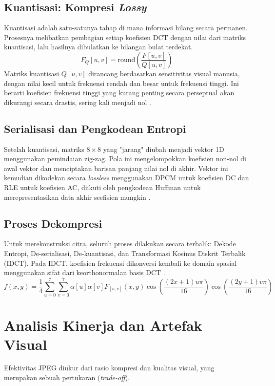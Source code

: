 \documentclass[a4paper]{article}
\begin{document}
\subsection{Kuantisasi: Kompresi \textit{Lossy}}
Kuantisasi adalah satu-satunya tahap di mana informasi hilang secara permanen. Prosesnya melibatkan pembagian setiap koefisien DCT dengan nilai dari matriks kuantisasi, lalu hasilnya dibulatkan ke bilangan bulat terdekat.
\begin{equation} \label{eq:quantization}
  F_Q[u, v] = \text{round}\left(\frac{F[u, v]}{Q[u, v]}\right)
\end{equation}
Matriks kuantisasi $Q[u,v]$ dirancang berdasarkan sensitivitas visual manusia, dengan nilai kecil untuk frekuensi rendah dan besar untuk frekuensi tinggi. Ini berarti koefisien frekuensi tinggi yang kurang penting secara perseptual akan dikurangi secara drastis, sering kali menjadi nol \cite{wallace1991jpeg}.

\subsection{Serialisasi dan Pengkodean Entropi}
Setelah kuantisasi, matriks $8 \times 8$ yang "jarang" diubah menjadi vektor 1D menggunakan pemindaian zig-zag. Pola ini mengelompokkan koefisien non-nol di awal vektor dan menciptakan barisan panjang nilai nol di akhir. Vektor ini kemudian dikodekan secara \textit{lossless} menggunakan DPCM untuk koefisien DC dan RLE untuk koefisien AC, diikuti oleh pengkodean Huffman untuk merepresentasikan data akhir seefisien mungkin \cite{wallace1991jpeg}.

\subsection{Proses Dekompresi}
Untuk merekonstruksi citra, seluruh proses dilakukan secara terbalik: Dekode Entropi, De-serialisasi, De-kuantisasi, dan Transformasi Kosinus Diskrit Terbalik (IDCT). Pada IDCT, koefisien frekuensi dikonversi kembali ke domain spasial menggunakan sifat dari keorthonormalan basis DCT \cite{wallace1991jpeg}.
\begin{equation}
  f(x,y) = \frac{1}{4} \sum_{u=0}^{7} \sum_{v=0}^{7} \alpha[u] \alpha[v] F_{[u,v]}(x,y) \cos\left(\frac{(2x+1)u\pi}{16}\right) \cos\left(\frac{(2y+1)v\pi}{16}\right)
\end{equation}

\section{Analisis Kinerja dan Artefak Visual}
Efektivitas JPEG diukur dari rasio kompresi dan kualitas visual, yang merupakan sebuah pertukaran (\textit{trade-off}).
\end{document}
